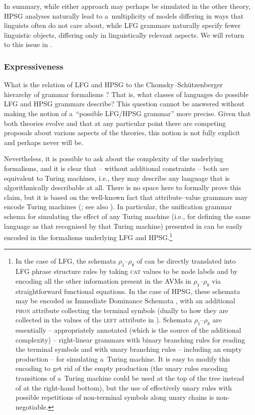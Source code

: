 \documentclass[output=paper,hidelinks]{langscibook}
\begin{document}
In summary, while either approach may perhaps be simulated in the other theory, HPSG analyses naturally lead to a~multiplicity of models differing in ways that linguists often do not care about, while LFG grammars naturally specify fewer linguistic objects, differing only in linguistically relevant aspects.  We will return to this issue in .

\subsubsection{Expressiveness}
\label{sec:gram:exp}

What is the relation of LFG and HPSG to the Chomsky--Schützenberger hierarchy of grammar formalisms \citep{chom:56}?  That is, what classes of languages do possible LFG and HPSG grammars describe?  This question cannot be answered without making the notion of a~“possible LFG/HPSG grammar” more precise.  Given that both theories evolve and that at any particular point there are competing proposals about various aspects of the theories, this notion is not fully explicit and perhaps never will be.

Nevertheless, it is possible to ask about the complexity of the underlying formalisms, and it is clear that -- without additional constraints -- both are equivalent to Turing machines, i.e., they may describe any language that is algorithmically describable at all.  There is no space here to formally prove this claim, but it is based on the well-known fact that attribute--value grammars may encode Turing machines (\citealt[Section {3.4.2}]{john:88:book}; see also \citealt[fn. 32]{kaplanbresnan82}).  In particular, the unification grammar schema for simulating the effect of any Turing machine (i.e., for defining the same language as that recognised by that Turing machine) presented in \citet[Section {6.2}]{fra:win:12} can be easily encoded in the formalisms underlying LFG and HPSG\@.\footnote{\label{fn:turing}In the case of LFG, the schemata $\rho_1$--$\rho_8$ of \citet[230--232]{fra:win:12} can be directly translated into LFG phrase structure rules by taking \textsc{cat} values to be node labels and by encoding all the other information present in the AVMs in $\rho_1$--$\rho_8$ via straightforward functional equations.  In the case of HPSG, these schemata may be encoded as Immediate Dominance Schemata \citep[Section {1.5}]{pollard1994head-driven}, with an additional \textsc{phon} attribute collecting the terminal symbols (dually to how they are collected in the values of the \textsc{left} attribute in \citealt{fra:win:12}).  Schemata $\rho_1$--$\rho_8$ are essentially -- appropriately annotated (which is the source of the additional complexity) -- right-linear grammars with binary branching rules for reading the terminal symbols and with unary branching rules -- including an empty production -- for simulating a~Turing machine.  It is easy to modify this encoding to get rid of the empty production (the unary rules encoding transitions of a~Turing machine could be used at the top of the tree instead of at the right-hand bottom), but the use of effectively unary rules with possible repetitions of non-terminal symbols along unary chains is non-negotiable.}\largerpage
\end{document}
